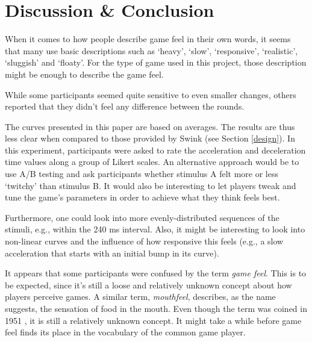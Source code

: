 \section{Discussion \& Conclusion} \label{discussion}
When it comes to how people describe game feel in their own words, it seems that many use basic descriptions such as `heavy', `slow', `responsive', `realistic', `sluggish' and `floaty'. For the type of game used in this project, those description might be enough to describe the game feel.


While some participants seemed quite sensitive to even smaller changes, others reported that they didn't feel any difference between the rounds.

The curves presented in this paper are based on averages. The results are thus less clear when compared to those provided by Swink (see Section \ref{design}). In this experiment, participants were asked to rate the acceleration and deceleration time values along a group of Likert scales. An alternative approach would be to use A/B testing and ask participants whether stimulus A felt more or less `twitchy' than stimulus B. It would also be interesting to let players tweak and tune the game's parameters in order to achieve what they think feels best.

Furthermore, one could look into more evenly-distributed sequences of the stimuli, e.g., within the 240 ms interval. Also, it might be interesting to look into non-linear curves and the influence of how responsive this feels (e.g., a slow acceleration that starts with an initial bump in its curve).

It appears that some participants were confused by the term \textit{game feel}. This is to be expected, since it's still a loose and relatively unknown concept about how players perceive games. A similar term, \textit{mouthfeel}, describes, as the name suggests, the sensation of food in the mouth. Even though the term was coined in 1951 \cite{mouthfeel}, it is still a relatively unknown concept. It might take a while before game feel finds its place in the vocabulary of the common game player.

